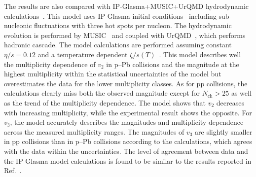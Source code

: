 The results are also compared with IP-Glasma+MUSIC+UrQMD hydrodynamic calculations~\cite{Schenke:2020mbo}. This model uses IP-Glasma initial conditions~\cite{Schenke:2012wb} including sub-nucleonic fluctuations with three hot spots per nucleon. The hydrodynamic evolution is performed by MUSIC~\cite{Schenke:2010rr} and coupled with UrQMD~\cite{Bass:1998ca,Bleicher:1999xi}, which performs hadronic cascade. 
The model calculations are performed assuming constant $\eta/s=0.12$ and a temperature dependent $\zeta/s(T)$~\cite{Rose:2020lfc}. 
This model describes well the multiplicity dependence of $v_2$ in p--Pb collisions and the magnitude at the highest multiplicity within the statistical uncertainties of the model but overestimates the data for the lower multiplicity classes. As for pp collisions, the calculations clearly miss both the observed magnitude except for $N_\mathrm{ch}>25$ as well as the trend of the multiplicity dependence. The model shows that $v_2$ decreases with increasing multiplicity, while the experimental result shows the opposite.
For $v_3$, the model accurately describes the magnitudes and multiplicity dependence across the measured multiplicity ranges. The magnitudes of $v_3$ are slightly smaller in pp collisions than in p--Pb collisions according to the calculations, which agrees with the data within the uncertainties. The level of agreement between data and the IP Glasma model calculations is found to be similar to the results reported in Ref.~\cite{Acharya:2019vdf}.

